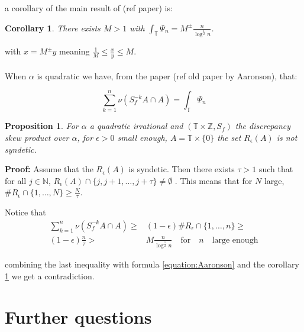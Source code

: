 \documentclass{article}
\newtheorem{corollary}{Corollary}[theorem]
\newtheorem{proposition}{Proposition}[section]
\begin{document}
a corollary of the  main result of (ref paper) is:

\begin{corollary}\label{corollary:Aaronson}
There exists $M>1$ with $\int_\mathbb{T} \Psi_n=M^{\pm}\frac{n}{\log^{\frac{1}{2}}n}$. 
\end{corollary}

with $x=M^\pm y$ meaning $\frac{1}{M}\leq \frac{x}{y}\leq M$.
\paragraph{}
When $\alpha$ is quadratic we have, from the paper (ref old paper
by Aaronson), that:

\begin{equation}\label{equation:Aaronson}
    \sum_{k=1}^{n}\nu (S_f^{-k}A\cap A)=\int_\mathbb{T}\Psi_n
\end{equation}


\begin{proposition}
For $\alpha$ a quadratic irrational and $(\mathbb{T}\times\mathbb{Z},
S_f)$ the discrepancy skew product over $\alpha$, for $\epsilon>0$ small
enough, $A=\mathbb{T}\times \{0\}$ the set $R_{\epsilon}(A)$ is not
syndetic.
\end{proposition}

\textbf{Proof:} Assume that the $R_\epsilon(A)$ is
syndetic. Then there exists $\tau>1$ such that for all $j\in\mathbb{N}$, $R_\epsilon(A)\cap
\{j,j+1,\ldots,j+\tau\}\neq \emptyset$ . This means that for $N$
large, $\# R_\epsilon\cap \{1,\ldots,N\}\geq \frac{N}{\tau}$.

Notice that 
\begin{align}
    \sum_{k=1}^{n}\nu (S_f^{-k}A\cap A)\geq& (1-\epsilon)\#R_\epsilon\cap \{1,\ldots,n\}\geq\\
    (1-\epsilon)\frac{n}{\tau}>& M \frac{n}{\log^{\frac{1}{2}}n}\quad \text{for}\quad n\quad \text{large enough}      
\end{align}

combining the last inequality with formula
 \ref{equation:Aaronson} and the corollary \ref{corollary:Aaronson}
 we get a contradiction.
 
 

 \section{Further questions}
\end{document}
